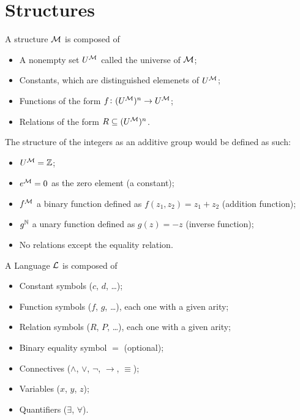 \documentclass[11pt,a4paper]{article}
\renewcommand{\implies}{\rightarrow}
\begin{document}
  \section{Structures}
  \begin{definition}[Strcture]
    A structure $\mathcal{M}$ is composed of
    \begin{itemize}
      \item A nonempty set $U^{\mathcal{M}}$ called the universe of $\mathcal{M}$;
      \item Constants, which are distinguished elemenets of $U^{\mathcal{M}}$;
      \item Functions of the form $f \colon (U^{\mathcal{M}})^n \to U^{\mathcal{M}}$;
      \item Relations of the form $R \subseteq (U^{\mathcal{M}})^n$.
    \end{itemize}
  \end{definition}

  \begin{example}\label{example:group-structure}
    The structure of the integers as an additive group would be defined
    as such:
    \begin{itemize}
      \item $U^{\mathcal{M}} = \mathbb{Z}$;
      \item $e^{\mathcal{M}} = 0$ as the zero element (a constant);
      \item $f^{\mathcal{M}}$ a binary function defined as $f(z_1,z_2) = z_1 + z_2$ 
        (addition function);
      \item $g^{\mathbb{N}}$ a unary function defined as $g(z) = -z$ (inverse function);
      \item No relations except the equality relation.
    \end{itemize}
  \end{example}

  \begin{definition}[Language]
    A Language $\mathcal{L}$ is composed of
    \begin{itemize}
      \item Constant symbols ($c$, $d$, \dots);
      \item Function symbols ($f$, $g$, \dots), each one with a given arity;
      \item Relation symbols ($R$, $P$, \dots), each one with a given arity;
      \item Binary equality symbol $=$ (optional);
      \item Connectives ($\land$, $\lor$, $\neg$, $\implies$, $\equiv$);
      \item Variables ($x$, $y$, $z$);
      \item Quantifiers ($\exists$, $\forall$).
    \end{itemize}
  \end{definition}
\end{document}
